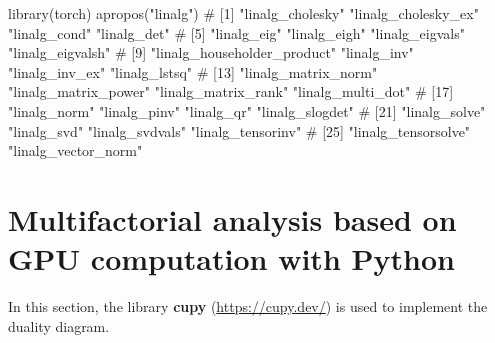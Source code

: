 \documentclass[
  10pt,
]{article}
\newenvironment{Shaded}{\begin{snugshade}}{\end{snugshade}}
\newcommand{\NormalTok}[1]{#1}
\begin{document}
\begin{Shaded}
\begin{Highlighting}[]
\NormalTok{library(torch)}
\NormalTok{apropos("linalg")}
\NormalTok{\#  [1] "linalg\_cholesky"            "linalg\_cholesky\_ex"         "linalg\_cond"                "linalg\_det"                }
\NormalTok{\#  [5] "linalg\_eig"                 "linalg\_eigh"                "linalg\_eigvals"             "linalg\_eigvalsh"           }
\NormalTok{\#  [9] "linalg\_householder\_product" "linalg\_inv"                 "linalg\_inv\_ex"              "linalg\_lstsq"              }
\NormalTok{\# [13] "linalg\_matrix\_norm"         "linalg\_matrix\_power"        "linalg\_matrix\_rank"         "linalg\_multi\_dot"          }
\NormalTok{\# [17] "linalg\_norm"                "linalg\_pinv"                "linalg\_qr"                  "linalg\_slogdet"            }
\NormalTok{\# [21] "linalg\_solve"               "linalg\_svd"                 "linalg\_svdvals"             "linalg\_tensorinv"          }
\NormalTok{\# [25] "linalg\_tensorsolve"         "linalg\_vector\_norm"  }
\end{Highlighting}
\end{Shaded}

\section{Multifactorial analysis based on GPU computation with
Python}\label{multifactorial-analysis-based-on-gpu-computation-with-python}

In this section, the library \textbf{cupy} (\url{https://cupy.dev/}) is
used to implement the duality diagram.
\end{document}
